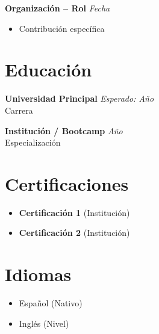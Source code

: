 \documentclass[11pt,a4paper]{article}
\begin{document}
\noindent
\textbf{Organización – Rol} \hfill \textit{Fecha}
\begin{itemize}
  \item Contribución específica
\end{itemize}

\section*{Educación}

\noindent
\textbf{Universidad Principal} \hfill \textit{Esperado: Año} \\
Carrera

\noindent
\textbf{Institución / Bootcamp} \hfill \textit{Año} \\
Especialización

\section*{Certificaciones}

\begin{itemize}
  \item \textbf{Certificación 1} (Institución)
  \item \textbf{Certificación 2} (Institución)
\end{itemize}

\section*{Idiomas}

\begin{itemize}
  \item Español (Nativo)
  \item Inglés (Nivel)
\end{itemize}
\end{document}
